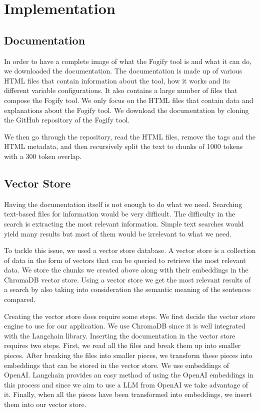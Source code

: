 \section{Implementation}
\label{sec:implementation}

\subsection[short]{Documentation}

In order to have a complete image of what the Fogify tool is and what it can
do, we downloaded the documentation. The documentation is made up of various
HTML files that contain information about the tool, how it works and its
different variable configurations. It also contains a large number of files
that
compose the Fogify tool. We only focus on the HTML files that contain data and
explanations about the Fogify tool.
We download the documentation by cloning the GitHub repository of the Fogify
tool.

We then go through the repository, read the HTML files, remove the tags and the
HTML metadata, and then recursively split the text to chunks of 1000 tokens
with a 300 token overlap.

\subsection{Vector Store}

Having the documentation itself is not enough to do what we need. Searching
text-based
files for information would be very difficult. The difficulty in the search
is extracting the most relevant information. Simple text searches would
yield many results but most of them would be irrelevant to what we need.

To tackle this issue, we used a vector store database. A vector store is a
collection of
data in the form of vectors that can be queried to retrieve the most relevant
data. We store the chunks we created above along with their embeddings in the
ChromaDB vector store. Using a vector store we get the most relevant
results of a search by also taking into consideration the semantic meaning of
the sentences compared.

Creating the vector store does require some steps. We first decide the
vector store engine to use for our application. We use ChromaDB since it is
well
integrated with the Langchain library. Inserting the documentation in the
vector store requires two steps. First, we read all the files and break
them up into smaller pieces. After breaking the files into smaller pieces, we
transform these pieces into embeddings that can be stored in the
vector store. We use embeddings of OpenAI. Langchain provides an easy
method of using the OpenAI embeddings in this process and since we aim to use
a LLM from OpenAI we take advantage of it. Finally,
when all the pieces have been transformed into embeddings, we insert
them into our vector store.

